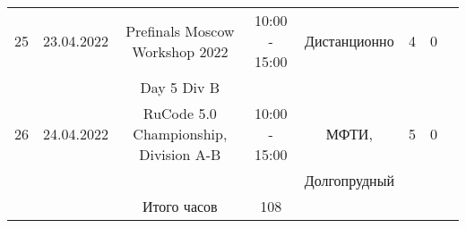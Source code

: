 {\begin{tabular}{|c|c|c|c|c|c|c|c|}
25 & 23.04.2022 & Prefinals Moscow Workshop 2022 & 10:00 - 15:00 & Дистанционно & 4 & 0 & \\
& & Day 5 Div B & & & & & \\
\hline

26 & 24.04.2022 & RuCode 5.0 Championship, Division A-B & 10:00 - 15:00 & МФТИ, & 5 & 0 & \\
& & & & Долгопрудный & & & \\
\hline

& & Итого часов & 108 & & & & \\
\hline
\end{tabular}
}

\pagebreak
